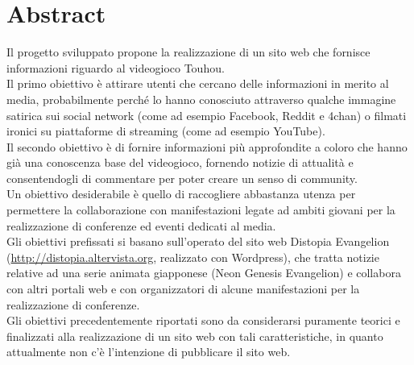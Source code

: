 \documentclass[openany, a4paper, 12pt]{report}
\begin{document}


	\chapter{Abstract}
	Il progetto sviluppato propone la realizzazione di un sito web che fornisce informazioni riguardo al videogioco Touhou.\\
	Il primo obiettivo è attirare utenti che cercano delle informazioni in merito al media, probabilmente perché lo hanno conosciuto attraverso qualche immagine satirica sui social network (come ad esempio Facebook, Reddit e 4chan) o filmati ironici su piattaforme di streaming (come ad esempio YouTube).\\
	Il secondo obiettivo è di fornire informazioni più approfondite a coloro che hanno già una conoscenza base del videogioco, fornendo notizie di attualità e consentendogli di commentare per poter creare un senso di community.\\
	Un obiettivo desiderabile è quello di raccogliere abbastanza utenza per permettere la collaborazione con manifestazioni legate ad ambiti giovani per la realizzazione di conferenze ed eventi dedicati al media.\\
	Gli obiettivi prefissati si basano sull'operato del sito web Distopia Evangelion (\url{http://distopia.altervista.org}, realizzato con Wordpress), che tratta notizie relative ad una serie animata giapponese (Neon Genesis Evangelion) e collabora con altri portali web e con organizzatori di alcune manifestazioni per la realizzazione di conferenze.\\
	Gli obiettivi precedentemente riportati sono da considerarsi puramente teorici e finalizzati alla realizzazione di un sito web con tali caratteristiche, in quanto attualmente non c'è l'intenzione di pubblicare il sito web.
\end{document}
